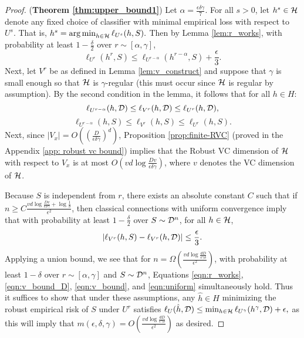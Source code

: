\begin{proof}
(\textbf{Theorem \ref{thm:upper_bound1}}) Let $\alpha = \frac{\epsilon\delta\gamma}{7}$. For all $s > 0$, let $h^s \in \mathcal H$ denote any fixed choice of classifier with minimal empirical loss with respect to $U^s$. That is, $h^s = \operatorname*{arg\,min}_{h \in \mathcal H} \ell_{U^s}(h, S).$ Then by Lemma \ref{lem:r_works}, with probability at least $1 - \frac{\delta}{2}$ over $r \sim [\alpha, \gamma]$, 
\begin{equation}\label{eqn:r_works}
\ell_{U^{r}}(h^{r}, S) \leq \ell_{U^{r-\alpha}}(h^{r-\alpha}, S) + \frac{\epsilon}{3}.
\end{equation}
Next, let $V^r$ be as defined in Lemma \ref{lem:v_construct} and suppose that $\gamma$ is small enough so that $\mathcal H$ is $\gamma$-regular (this must occur since $\mathcal H$ is regular by assumption). By the second condition in the lemma, it follows that for all $h \in H$:
\begin{equation}\label{eqn:v_bound_D}
\ell_{U^{r-\alpha}}(h, \mathcal D) \leq \ell_{V^r}(h, \mathcal D) \leq \ell_{U^r}(h, \mathcal D),
\end{equation}
\begin{equation}\label{eqn:v_bound}
\ell_{U^{r-\alpha}}(h, S) \leq \ell_{V^r}(h, S) \leq \ell_{U^r}(h, S).
\end{equation}
 Next, since $|V_x| = O\left(\left(\frac{D}{\epsilon\delta\gamma}\right)^d\right)$, Proposition \ref{prop:finite-RVC} (proved in the Appendix \ref{app: robust vc bound}) implies that the Robust VC dimension of $\mathcal H$ with respect to $V_x$ is at most $O\left(vd\log \frac{Dv}{\epsilon\delta\gamma} \right)$, where $v$ denotes the VC dimension of $\mathcal H$. 
 
 
Because $S$ is independent from $r$, there exists an absolute constant $C$ such that if $n \geq C\frac{vd\log \frac{Dv}{\epsilon\delta\gamma} +\log\frac{1}{\delta}}{\epsilon^2}$, then classical connections with uniform convergence \cite{vapnik1974theory} imply that with probability at least $1 - \frac{\delta}{2}$ over $S \sim \mathcal D^n$, for all $h \in \mathcal H$, 
\begin{equation}\label{eqn:uniform}
|\ell_{V^r}(h, S) - \ell_{V^r}(h, \mathcal D)| \leq \frac{\epsilon}{3}.
\end{equation}
Applying a union bound, we see that for $n = \Omega\left( \frac{vd\log \frac{dD}{\epsilon\gamma\delta}}{\epsilon^2}\right)$, with probability at least $1-\delta$ over $r \sim [\alpha,\gamma]$ and $S \sim \mathcal D^n$, Equations \ref{eqn:r_works},
\ref{eqn:v_bound_D}, \ref{eqn:v_bound}, and \ref{eqn:uniform} simultaneously hold. Thus it suffices to show that under these assumptions, any $\hat{h} \in H$ minimizing the robust empirical risk of $S$ under $U^r$ satisfies $\ell_U(\hat{h}, \mathcal D) \leq \min_{h \in \mathcal H} \ell_{U^\gamma}(h^\gamma, \mathcal D) + \epsilon,$ as this will imply that $m(\epsilon, \delta, \gamma) = O\left( \frac{vd\log \frac{dD}{\epsilon\gamma\delta}}{\epsilon^2}\right)$ as desired. 


\end{proof}

